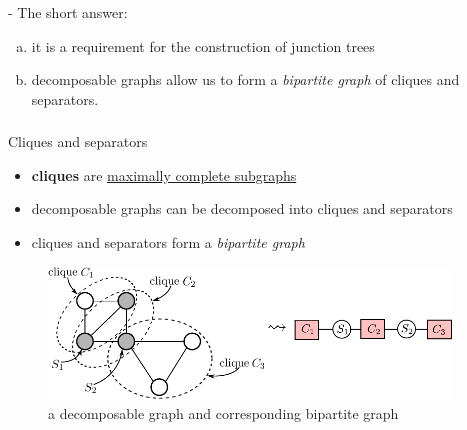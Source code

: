 \begin{frame}
	\slidesonly{\vspace{-5mm}}
	
	
	- The short answer:
	\begin{enumerate}[(a)]
	\item it is a requirement for the construction of junction trees 
	\item decomposable graphs allow us to form a \emph{bipartite graph} of cliques and separators.
	\end{enumerate}
	
\end{frame}
\begin{frame} \frametitle{\secname}

	\begin{block}{Cliques and separators}
	\begin{itemize}
		\item \textbf{cliques} are \underline{maximally complete subgraphs}
		\item decomposable graphs can be decomposed into cliques and separators
		\item cliques and separators form a \emph{bipartite graph}
	\end{itemize}
	\end{block}
	
	\slidesonly{\vspace{4mm}}
	
	\begin{figure}[h]
	\centering
	\includegraphics[height=3.5cm]{img/section3_fig15}
	\caption{a decomposable graph and corresponding bipartite graph}
	\end{figure}
	
		
\end{frame}


